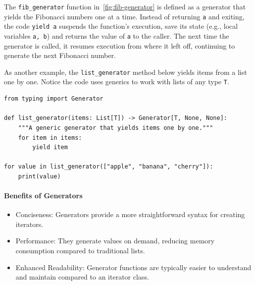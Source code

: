 \documentclass[oneside,11pt,dvipsnames]{book}
\newcommand{\code}[1]{\texttt{#1}}
\begin{document}
The \code{fib\_generator} function in~\autoref{fig:fib-generator} is defined as a generator that yields the Fibonacci numbers one at a time. Instead of returning \code{a} and exiting, the code \code{yield a} suspends the function's execution, save its state (e.g., local variables \code{a, b}) and returns the value of \code{a} to the caller. The next time the generator is called, it resumes execution from where it left off, continuing to generate the next Fibonacci number.


As another example, the \code{list\_generator} method below yields items from a list one by one. Notice the code uses generics to work with lists of any type \code{T}.

\begin{lstlisting}
from typing import Generator

def list_generator(items: List[T]) -> Generator[T, None, None]:
    """A generic generator that yields items one by one."""
    for item in items:
        yield item

for value in list_generator(["apple", "banana", "cherry"]):
    print(value)
\end{lstlisting}

\paragraph{Benefits of Generators}
\begin{itemize}
    \item Conciseness: Generators provide a more straightforward syntax for creating iterators.
	\item Performance: They generate values on demand, reducing memory consumption compared to traditional lists.
	\item Enhanced Readability: Generator functions are typically easier to understand and maintain compared to an iterator class.    
\end{itemize}   
\end{document}
